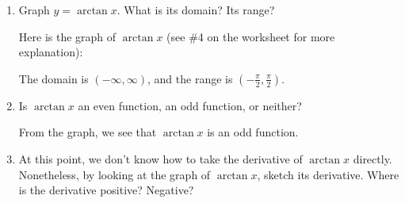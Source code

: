\documentclass{article}
\begin{document}
\begin{enumerate}[topsep=0pt]
  \begin{enumerate}

  \item
\begin{problem}[\stretch{3}]
      Graph $y=\arctan x$. What is its domain?  Its range?
    \end{problem}

    \begin{solution}
      Here is the graph of $\arctan x$ (see
        {{\#4}} on the worksheet for more explanation):
      \begin{center}
      \end{center}
      The domain is $(-\infty, \infty)$, and the range is
      $\left(-\frac{\pi}{2}, \frac{\pi}{2} \right)$.
    \end{solution}

  \item
    \begin{problem}[\stretch{1}]
      Is $\arctan x$ an even function, an odd function, or neither?
    \end{problem}

    \begin{solution}
      From the graph, we see that $\arctan x$ is an odd function. 
    \end{solution}

  \item
    \begin{problem}[\stretch{3}]
      At this point, we don't know how to take the derivative of $\arctan
      x$ directly. Nonetheless, by looking at the graph of $\arctan
      x$, sketch its derivative.  Where is the derivative positive?
      Negative?
    \end{problem}


\end{enumerate}
\end{enumerate}
\end{document}
